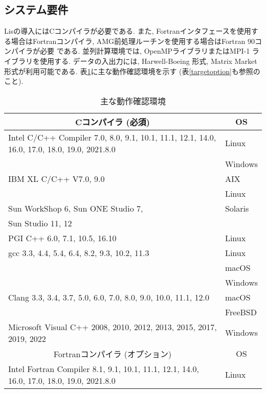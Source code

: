 \documentclass[a4paper]{jarticle}
\begin{document}
\subsection{システム要件}
Lisの導入にはCコンパイラが必要である. 
また, Fortranインタフェースを使用する場合はFortranコンパイラ, 
AMG前処理ルーチンを使用する場合はFortran 90コンパイラが必要
である. 並列計算環境では, OpenMPライブラリ\cite{OpenMP}またはMPI-1
ライブラリ\cite{MPI}を使用する\cite{kota1,kota2}. 
データの入出力には, Harwell-Boeing 
形式\cite{duff92}, Matrix Market形式\cite{matrixmarket}が利用可能である. 
表\ref{platforms}に主な動作確認環境を示す
 (表\ref{targetoption}も参照のこと). 

\begin{table}[htbp]
\caption{主な動作確認環境}
\label{platforms}
\begin{center}
{\small
 \begin{tabular}{l|l}
\hline
\multicolumn{1}{c|}{Cコンパイラ (必須) } & \multicolumn{1}{c}{OS} \\
\hline
Intel C/C++ Compiler 7.0, 8.0, 9.1, 10.1, 11.1, 12.1, 14.0, 16.0, 17.0, 18.0, 19.0, 2021.8.0 & Linux \\
                                                     & Windows  \\
\hline
IBM XL C/C++ V7.0, 9.0                     & AIX   \\
                                           & Linux \\
\hline
Sun WorkShop 6, Sun ONE Studio 7,          & Solaris \\
Sun Studio 11, 12                          &         \\
\hline
PGI C++ 6.0, 7.1, 10.5, 16.10              & Linux \\
\hline
gcc 3.3, 4.4, 5.4, 6.4, 8.2, 9.3, 10.2, 11.3     & Linux \\
                                           & macOS \\
                                           & Windows \\
\hline
Clang 3.3, 3.4, 3.7, 5.0, 6.0, 7.0, 8.0, 9.0, 10.0, 11.1, 12.0 & macOS \\
                                           & FreeBSD \\
\hline
Microsoft Visual C++ 2008, 2010, 2012, 2013, 2015, 2017, 2019, 2022 & Windows \\
\hline
\hline
\multicolumn{1}{c|}{Fortranコンパイラ (オプション) } & \multicolumn{1}{c}{OS} \\
\hline
Intel Fortran Compiler 8.1, 9.1, 10.1, 11.1, 12.1, 14.0, 16.0, 17.0, 18.0, 19.0, 2021.8.0 & Linux \\

\end{tabular}}
\end{center}
\end{table}
\end{document}
